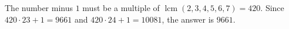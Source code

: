 The number minus $1$ must be a multiple of $\operatorname{lcm}(2,3,4,5,6,7)=420$. Since $420\cdot23+1=9661$ and $420\cdot24+1=10081$, the answer is $\boxed{9661}$.
